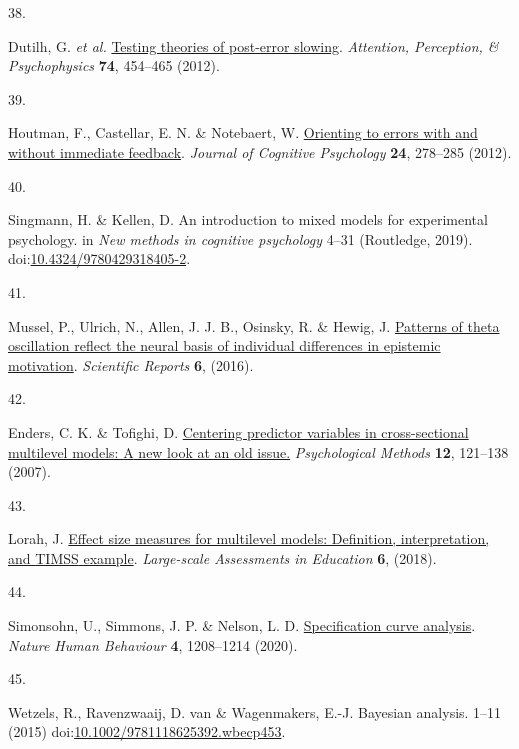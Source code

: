 \documentclass[
  man,floatsintext]{apa6}
\newlength{\cslhangindent}
\newlength{\csllabelwidth}
\newlength{\cslentryspacingunit} %
\newenvironment{CSLReferences}[2] %
 {%
  \setlength{\parindent}{0pt}
  \ifodd #1
  \let\oldpar\par
  \def\par{\hangindent=\cslhangindent\oldpar}
  \fi
  \setlength{\parskip}{#2\cslentryspacingunit}
 }%
 {}
\newcommand{\CSLLeftMargin}[1]{\parbox[t]{\csllabelwidth}{#1}}
\newcommand{\CSLRightInline}[1]{\parbox[t]{\linewidth - \csllabelwidth}{#1}\break}
\begin{document}
\begin{CSLReferences}{0}{0}
\leavevmode{}%
\CSLLeftMargin{38. }%
\CSLRightInline{Dutilh, G. \emph{et al.} \href{https://doi.org/10.3758/s13414-011-0243-2}{Testing theories of post-error slowing}. \emph{Attention, Perception, \& Psychophysics} \textbf{74}, 454--465 (2012).}

\leavevmode{}%
\CSLLeftMargin{39. }%
\CSLRightInline{Houtman, F., Castellar, E. N. \& Notebaert, W. \href{https://doi.org/10.1080/20445911.2011.617301}{Orienting to errors with and without immediate feedback}. \emph{Journal of Cognitive Psychology} \textbf{24}, 278--285 (2012).}

\leavevmode{}%
\CSLLeftMargin{40. }%
\CSLRightInline{Singmann, H. \& Kellen, D. An introduction to mixed models for experimental psychology. in \emph{New methods in cognitive psychology} 4--31 (Routledge, 2019). doi:\href{https://doi.org/10.4324/9780429318405-2}{10.4324/9780429318405-2}.}

\leavevmode{}%
\CSLLeftMargin{41. }%
\CSLRightInline{Mussel, P., Ulrich, N., Allen, J. J. B., Osinsky, R. \& Hewig, J. \href{https://doi.org/10.1038/srep29245}{Patterns of theta oscillation reflect the neural basis of individual differences in epistemic motivation}. \emph{Scientific Reports} \textbf{6}, (2016).}

\leavevmode{}%
\CSLLeftMargin{42. }%
\CSLRightInline{Enders, C. K. \& Tofighi, D. \href{https://doi.org/10.1037/1082-989x.12.2.121}{Centering predictor variables in cross-sectional multilevel models: {A} new look at an old issue.} \emph{Psychological Methods} \textbf{12}, 121--138 (2007).}

\leavevmode{}%
\CSLLeftMargin{43. }%
\CSLRightInline{Lorah, J. \href{https://doi.org/10.1186/s40536-018-0061-2}{Effect size measures for multilevel models: Definition, interpretation, and {TIMSS} example}. \emph{Large-scale Assessments in Education} \textbf{6}, (2018).}

\leavevmode{}%
\CSLLeftMargin{44. }%
\CSLRightInline{Simonsohn, U., Simmons, J. P. \& Nelson, L. D. \href{https://doi.org/10.1038/s41562-020-0912-z}{Specification curve analysis}. \emph{Nature Human Behaviour} \textbf{4}, 1208--1214 (2020).}

\leavevmode{}%
\CSLLeftMargin{45. }%
\CSLRightInline{Wetzels, R., Ravenzwaaij, D. van \& Wagenmakers, E.-J. Bayesian analysis. 1--11 (2015) doi:\href{https://doi.org/10.1002/9781118625392.wbecp453}{10.1002/9781118625392.wbecp453}.}


\end{CSLReferences}
\end{document}

